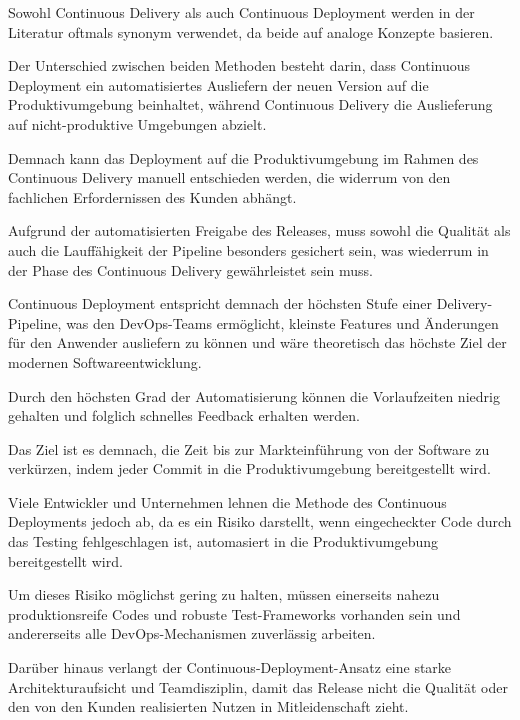 Sowohl Continuous Delivery als auch Continuous Deployment werden in der Literatur oftmals synonym verwendet, da beide auf analoge Konzepte basieren. 

Der Unterschied zwischen beiden Methoden besteht darin, dass Continuous Deployment ein automatisiertes Ausliefern der neuen Version auf die Produktivumgebung beinhaltet, während Continuous Delivery die Auslieferung auf nicht-produktive Umgebungen abzielt. 

Demnach kann das Deployment auf die Produktivumgebung im Rahmen des Continuous Delivery manuell entschieden werden, die widerrum von den fachlichen Erfordernissen des Kunden abhängt. \cite[S. 29 - 30]{alt_innovationsorientiertes_2017} 

Aufgrund der automatisierten Freigabe des Releases, muss sowohl die Qualität als auch die Lauffähigkeit der Pipeline besonders gesichert sein, was wiederrum in der Phase des Continuous Delivery gewährleistet sein muss. \cite[S. 269]{tiemeyer_handbuch_2021} 

Continuous Deployment entspricht demnach der höchsten Stufe einer Delivery-Pipeline, was den DevOps-Teams ermöglicht, kleinste Features und Änderungen für den Anwender ausliefern zu können und wäre theoretisch das höchste Ziel der modernen Softwareentwicklung. \cite{humble_why_2011}  

Durch den höchsten Grad der Automatisierung können die Vorlaufzeiten niedrig gehalten und folglich schnelles Feedback erhalten werden. \cite{humble_why_2011}   

Das Ziel ist es demnach, die Zeit bis zur Markteinführung von der Software zu verkürzen, indem jeder Commit in die Produktivumgebung bereitgestellt wird. 

Viele Entwickler und Unternehmen lehnen die Methode des Continuous Deployments jedoch ab, da es ein Risiko darstellt, wenn eingecheckter Code durch das Testing fehlgeschlagen ist, automasiert in die Produktivumgebung bereitgestellt wird. \cite[S. 269]{tiemeyer_handbuch_2021}  

Um dieses Risiko möglichst gering zu halten, müssen einerseits nahezu produktionsreife Codes und robuste Test-Frameworks vorhanden sein und andererseits alle DevOps-Mechanismen zuverlässig arbeiten. \cite[S. 269]{tiemeyer_handbuch_2021}  

Darüber hinaus verlangt der Continuous-Deployment-Ansatz eine starke Architekturaufsicht und Teamdisziplin, damit das Release nicht die Qualität oder den von den Kunden realisierten Nutzen in Mitleidenschaft zieht.\cite[S. 119 - 120]{erder_continuous_2016} 

